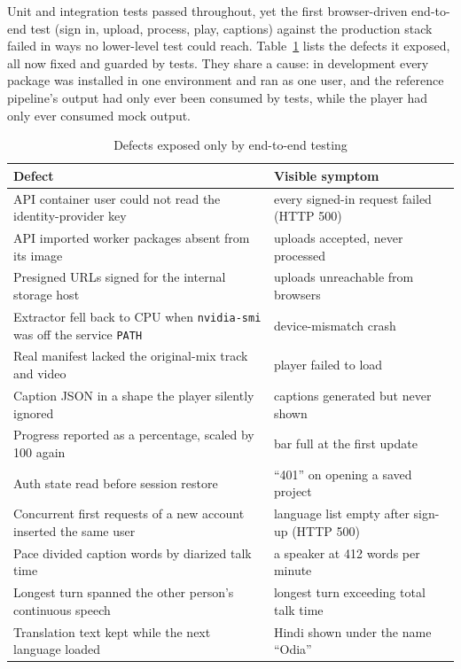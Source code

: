 \documentclass[conference]{IEEEtran}
\begin{document}
Unit and integration tests passed throughout, yet the first browser-driven end-to-end test (sign in, upload, process, play, captions) against the production stack failed in ways no lower-level test could reach. Table~\ref{tab:defects} lists the defects it exposed, all now fixed and guarded by tests. They share a cause: in development every package was installed in one environment and ran as one user, and the reference pipeline's output had only ever been consumed by tests, while the player had only ever consumed mock output.

\begin{table}[t]
\centering
\caption{Defects exposed only by end-to-end testing}
\label{tab:defects}
\footnotesize
\setlength{\tabcolsep}{3pt}
\begin{tabular}{@{}>{\raggedright\arraybackslash}p{}>{\raggedright\arraybackslash}p{}@{}}
\toprule
Defect & Visible symptom \\
\midrule
API container user could not read the identity-provider key & every signed-in request failed (HTTP 500) \\
API imported worker packages absent from its image & uploads accepted, never processed \\
Presigned URLs signed for the internal storage host & uploads unreachable from browsers \\
Extractor fell back to CPU when \texttt{nvidia-smi} was off the service \texttt{PATH} & device-mismatch crash \\
Real manifest lacked the original-mix track and video & player failed to load \\
Caption JSON in a shape the player silently ignored & captions generated but never shown \\
Progress reported as a percentage, scaled by 100 again & bar full at the first update \\
Auth state read before session restore & ``401'' on opening a saved project \\
Concurrent first requests of a new account inserted the same user & language list empty after sign-up (HTTP 500) \\
Pace divided caption words by diarized talk time & a speaker at 412 words per minute \\
Longest turn spanned the other person's continuous speech & longest turn exceeding total talk time \\
Translation text kept while the next language loaded & Hindi shown under the name ``Odia'' \\
\bottomrule
\end{tabular}
\end{table}
\end{document}
